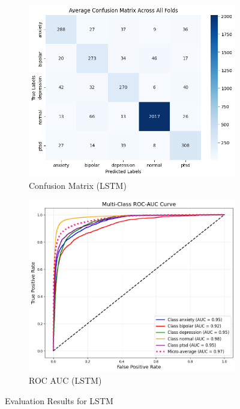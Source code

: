 \vspace{0.1em}

\begin{figure}[h!]
    \centering
    \begin{subfigure}[b]{0.49\textwidth}
        \centering
        \includegraphics[width=\textwidth]{Images/LSTM Confusion Matrix.png}
        \caption{Confusion Matrix (LSTM)}
        \label{LSTMCM}  %
    \end{subfigure}
    \hfill
    \begin{subfigure}[b]{0.49\textwidth}
        \centering
        \includegraphics[width=\textwidth]{Images/LSTM ROC.png}
        \caption{ROC AUC (LSTM)}
        \label{LSTMROC}  %
    \end{subfigure}
    \caption{Evaluation Results for LSTM}
    \label{fig:lstm_comparison}
\end{figure}

